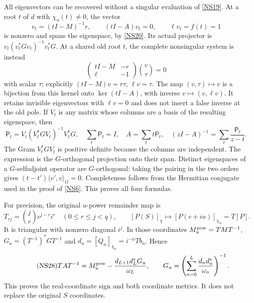 \documentclass[11pt]{article}
\begin{document}
All eigenvectors can be recovered without a singular
evaluation of \eqref{NS19}. At a root $t$ of $d$ with
$\chi_u(t)\ne0$, the vector
\begin{equation}\tag{NS24}\label{NS24}
v_t=(tI-M)^{-1}r,\qquad
(tI-A)v_t=0,\qquad \ell v_t=f(t)=1
\end{equation}
is nonzero and spans the eigenspace, by \eqref{NS20}.
Its actual projector is
$v_t(v_t^*Gv_t)^{-1}v_t^*G$.
At a shared old root $t$, the complete nonsingular
system is instead
\begin{equation}\tag{NS25}\label{NS25}
\begin{pmatrix}tI-M&-r\\ \ell&-1\end{pmatrix}
\binom v\tau=0
\end{equation}
with scalar $\tau$; explicitly
$(tI-M)v=r\tau$, $\ell v=\tau$.
The map $(v,\tau)\mapsto v$ is a bijection from this
kernel onto $\ker(tI-A)$, with inverse
$v\mapsto(v,\ell v)$. It retains invisible eigenvectors
with $\ell v=0$ and does not insert a false inverse
at the old pole. If $V_t$ is any matrix whose columns
are a basis of the resulting eigenspace, then
\begin{equation}\tag{NS26}\label{NS26}
\mathsf P_t=V_t(V_t^*GV_t)^{-1}V_t^*G,\quad
\sum_t\mathsf P_t=I,\quad
A=\sum_t t\mathsf P_t,\quad
(zI-A)^{-1}=\sum_t\frac{\mathsf P_t}{z-t}.
\end{equation}
The Gram $V_t^*GV_t$ is positive definite because the
columns are independent. The expression is the
$G$-orthogonal projection onto their span. Distinct
eigenspaces of a $G$-selfadjoint operator are
$G$-orthogonal: taking the pairing in the two orders
gives $(t-t')\langle v',v\rangle_G=0$.
Completeness follows from the Hermitian conjugate used
in the proof of \eqref{NS6}. This proves all four formulas.

For precision, the original $u$-power remainder map is
\begin{equation}\tag{NS27}\label{NS27}
T_{rj}=\binom jr c^{j-r}i^r\quad(0\leq r\leq j<q),\qquad
[P(S)]_\chi\longmapsto[P(c+iu)]_{\chi_u}=T[P].
\end{equation}
It is triangular with nonzero diagonal $i^j$.
In those coordinates
$M_u^{\rm pow}=TMT^{-1}$,
$G_u=(T^{-1})^*GT^{-1}$ and
$d_n=[Q_n]_{\chi_u}=i^{-n}Tb_n$. Hence
\begin{equation}\tag{NS28}\label{NS28}
TAT^{-1}
=M_u^{\rm pow}-\frac{d_{L+1}d_L^*G_u}{\omega_L},\qquad
G_u=\left(\sum_{n=0}^L
\frac{d_nd_n^*}{\omega_n}\right)^{-1}.
\end{equation}
This proves the real-coordinate sign and both coordinate
metrics. It does not replace the original $S$ coordinates.
\end{document}
